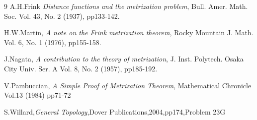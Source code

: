 \documentclass[leqno]{jsarticle}
\begin{document}
\begin{thebibliography}{9}
A.H.Frink {\it Distance functions and the metrization problem}, Bull. Amer. Math. Soc.
Vol. 43, No. 2 (1937), pp133-142.

H.W.Martin, {\it A note on the Frink metrization theorem}, Rocky Mountain J. Math.
Vol. 6, No. 1 (1976), pp155-158.

J.Nagata, {\it A contribution to the theory of metrization}, J. Inst. Polytech. Osaka City Univ. Ser. A
Vol. 8, No. 2 (1957), pp185-192.

V.Pambuccian, {\it A Simple Proof of Metrization Theorem}, Mathematical Chronicle Vol.13 (1984) pp71-72

S.Willard,{\it General Topology},Dover Publications,2004,pp174,Problem 23G
\end{thebibliography}




			
\end{document}
